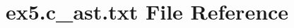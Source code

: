 \hypertarget{ex5_8c__ast_8txt}{}\section{ex5.\+c\+\_\+ast.\+txt File Reference}
\label{ex5_8c__ast_8txt}
